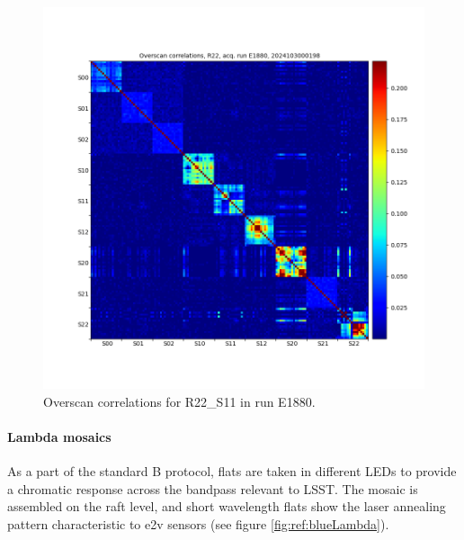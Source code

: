 \begin{figure}[ht]
    \centering
    \includegraphics[width=0.8\linewidth]{figures/ReferenceFigures/overscan_correlation_plot_LSSTCam_R22_S00_u_lsstccs_eo_raft_amp_correlations_E1880_w_2024_35_20241101T015955Z.png}
    \caption{Overscan correlations for R22\_S11 in run E1880.}
    \label{fig:ref:overscanCorrelations}
\end{figure}
\clearpage
\paragraph{Lambda mosaics}

As a part of the standard B protocol, flats are taken in different LEDs to provide a chromatic response across the bandpass relevant to LSST. The mosaic is assembled on the raft level, and short wavelength flats show the laser annealing pattern characteristic to e2v sensors (see figure \ref{fig:ref:blueLambda}).

